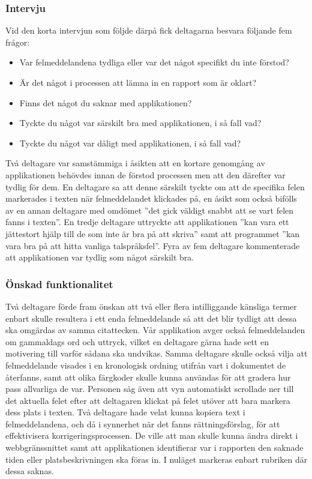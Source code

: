 \documentclass[swedish]{maucsthesis}
\begin{document}
\subsubsection{Intervju}

Vid den korta intervjun som följde därpå fick deltagarna besvara följande fem
frågor:
\begin{itemize}
\item Var felmeddelandena tydliga eller var det något specifikt du inte förstod?
\item Är det något i processen att lämna in en rapport som är oklart?
\item Finns det något du saknar med applikationen?
\item Tyckte du något var särskilt bra med applikationen, i så fall vad?
\item Tyckte du något var dåligt med applikationen, i så fall vad?
\end{itemize}

Två deltagare var samstämmiga i åsikten att en kortare genomgång av
applikationen behövdes innan de förstod processen men att den därefter var
tydlig för dem. En deltagare sa att denne särskilt tyckte om att de specifika
felen markerades i texten när felmeddelandet klickades på, en åsikt som också
bifölls av en annan deltagare med omdömet ”det gick väldigt snabbt att se vart
felen fanns i texten”. En tredje deltagare uttryckte att applikationen ”kan vara
ett jättestort hjälp till de som inte är bra på att skriva” samt att programmet
”kan vara bra på att hitta vanliga talspråksfel”. Fyra av fem deltagare
kommenterade att applikationen var tydlig som något särskilt bra.

\subsubsection{Önskad funktionalitet}\label{önskvärdafunktioner}

Två deltagare förde fram önskan att två eller flera intilliggande känsliga
termer enbart skulle resultera i ett enda felmeddelande så att det blir tydligt
att dessa ska omgärdas av samma citattecken. Vår applikation avger också
felmeddelanden om gammaldags ord och uttryck, vilket en deltagare gärna hade
sett en motivering till varför sådana ska undvikas. Samma deltagare skulle också
vilja att felmeddelande visades i en kronologisk ordning utifrån vart i
dokumentet de återfanns, samt att olika färgkoder skulle kunna användas för att
gradera hur pass allvarliga de var. Personen såg även att vyn automatiskt
scrollade ner till det aktuella felet efter att deltagaren klickat på felet
utöver att bara markera dess plats i texten. Två deltagare hade velat kunna
kopiera text i felmeddelandena, och då i synnerhet när det fanns
rättningsförslag, för att effektivisera korrigeringsprocessen. De ville att man
skulle kunna ändra direkt i webbgränssnittet samt att applikationen identifierar
var i rapporten den saknade tiden eller platsbeskrivningen ska föras in. I
nuläget markeras enbart rubriken där dessa saknas.
\end{document}
